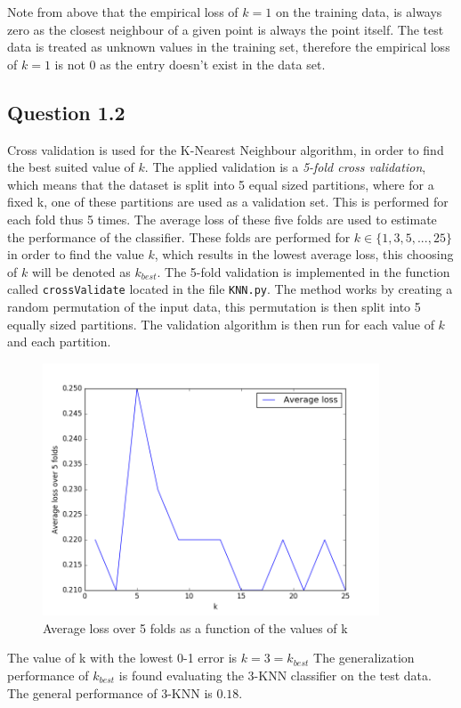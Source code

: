 \documentclass{article}
\begin{document}
Note from above that the empirical loss of $k=1$ on the training data, is always zero as the closest neighbour of a given point is always the point itself. The test data is treated as unknown values in the training set, therefore the empirical loss of $k=1$ is not 0 as the entry doesn't exist in the data set.
\subsection{Question 1.2}
Cross validation is used for the K-Nearest Neighbour algorithm, in order to find the best suited value of $k$. The applied validation is a \textit{5-fold cross validation}, which means that the dataset is split into 5 equal sized partitions, where for a fixed k, one of these partitions are used as a validation set. This is performed for each fold thus 5 times. The average loss of these five folds are used to estimate the performance of the classifier. These folds are performed for $k \in \lbrace 1,3,5,...,25 \rbrace$ in order to find the value $k$, which results in the lowest average loss, this choosing of $k$ will be denoted as $k_{best}$.  
The 5-fold validation is implemented in the function called \texttt{crossValidate} located in the file \texttt{KNN.py}. The method works by creating a random permutation of the input data, this permutation is then split into 5 equally sized partitions. The validation algorithm is then run for each value of $k$ and each partition.
\begin{figure}[H]
  \centering
  \includegraphics[width=10cm]{ass1.png}
  \caption{Average loss over 5 folds as a function of the values of k}
  \label{fig:cross1}
\end{figure}
The value of k with the lowest 0-1 error is $k = 3 = k_{best}$
The generalization performance of $k_{best}$ is found evaluating the 3-KNN classifier on the test data. The general performance of 3-KNN is $0.18$.
\end{document}
